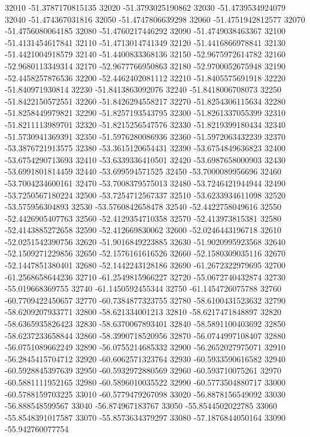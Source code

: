 {32010 -51.3787170815135
32020 -51.3793025190862
32030 -51.4739534924079
32040 -51.474367031816
32050 -51.4747806639298
32060 -51.4751942812577
32070 -51.4756080064185
32080 -51.4760217446292
32090 -51.4749038463367
32100 -51.4131454617841
32110 -51.4713014741349
32120 -51.4416866978841
32130 -51.4421004918579
32140 -51.4400833368136
32150 -52.9675972614782
32160 -52.9680113349314
32170 -52.9677766950863
32180 -52.9700052675948
32190 -52.4458257876536
32200 -52.4462402081112
32210 -51.8405575691918
32220 -51.840971930814
32230 -51.8413863092076
32240 -51.8418006708073
32250 -51.8422150572551
32260 -51.8426294558217
32270 -51.8254306115634
32280 -51.8258449979821
32290 -51.8257193543795
32300 -51.8261337055399
32310 -51.8211113989701
32320 -51.8215256547576
32330 -51.8219399180434
32340 -51.5730941369391
32350 -51.5976280086936
32360 -51.5972063432239
32370 -53.3876721913575
32380 -53.3615120654431
32390 -53.6754849636823
32400 -53.6754290713693
32410 -53.6339336410501
32420 -53.6987658000903
32430 -53.6991801814459
32440 -53.699594571525
32450 -53.7000089956696
32460 -53.7004234600161
32470 -53.7008379575013
32480 -53.7246421944944
32490 -53.7250567180224
32500 -53.7254712567337
32510 -53.6233934611098
32520 -53.575956304893
32530 -53.5760842658478
32540 -52.4422758049616
32550 -52.4426905407763
32560 -52.4129354710358
32570 -52.413973815381
32580 -52.4143885272658
32590 -52.412669830062
32600 -52.0246443196718
32610 -52.0251542390756
32620 -51.9016849223885
32630 -51.9020995923568
32640 -52.1509271229856
32650 -52.1576161616526
32660 -52.1580309035116
32670 -52.1447851380401
32680 -52.1442243128186
32690 -61.2672322979695
32700 -61.2568658644236
32710 -61.2549815966227
32720 -55.0672740432874
32730 -55.019668369755
32740 -61.1450592455344
32750 -61.1454726075788
32760 -60.7709422450657
32770 -60.7384877323755
32780 -58.6100431523632
32790 -58.6209207933771
32800 -58.621334001213
32810 -58.6217471848897
32820 -58.6365935826423
32830 -58.6370067893401
32840 -58.5891100403692
32850 -58.6237233658844
32860 -58.3990718520956
32870 -56.0744997108407
32880 -56.0751089662249
32890 -56.0755214685332
32900 -56.2652027975071
32910 -56.2845415704712
32920 -60.6062571323764
32930 -60.5933590616582
32940 -60.5928845397639
32950 -60.5932972880569
32960 -60.593710075261
32970 -60.5881111952165
32980 -60.5896010035522
32990 -60.5773504880717
33000 -60.5788159703225
33010 -60.5779479267098
33020 -56.8878156549092
33030 -56.888548599567
33040 -56.874967183767
33050 -55.8544502022785
33060 -55.8548391017587
33070 -55.8573634379297
33080 -57.1876844050164
33090 -55.942760077754
}
